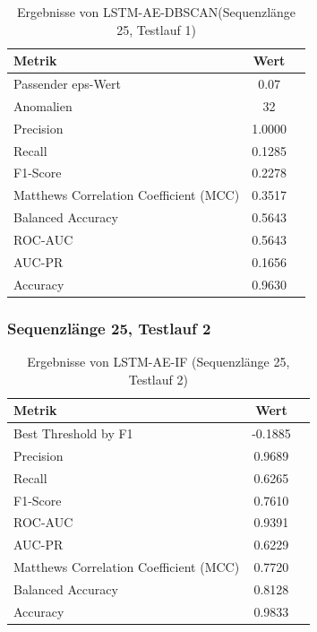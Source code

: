 \documentclass[a4paper,12pt]{article}
\begin{document}
\begin{table}[H]
	\centering
	\caption{Ergebnisse von LSTM-AE-DBSCAN(Sequenzlänge 25, Testlauf 1)}
	\begin{tabular}{lcc}
		\hline
		Metrik & Wert \\
		\hline
		Passender eps-Wert & 0.07 \\
		Anomalien & 32 \\
		Precision & 1.0000 \\
		Recall & 0.1285 \\
		F1-Score & 0.2278 \\
		Matthews Correlation Coefficient (MCC) & 0.3517 \\
		Balanced Accuracy & 0.5643 \\
		ROC-AUC & 0.5643 \\
		AUC-PR & 0.1656 \\
		Accuracy & 0.9630 \\
		\hline
	\end{tabular}
\end{table}

\subsubsection{Sequenzlänge 25, Testlauf 2}
\begin{table}[H]
	\centering
	\caption{Ergebnisse von LSTM-AE-IF (Sequenzlänge 25, Testlauf 2)}
	\begin{tabular}{lcc}
		\hline
		Metrik & Wert \\
		\hline
		Best Threshold by F1 & -0.1885 \\
		Precision & 0.9689 \\
		Recall & 0.6265 \\
		F1-Score & 0.7610 \\
		ROC-AUC & 0.9391 \\
		AUC-PR & 0.6229 \\
		Matthews Correlation Coefficient (MCC) & 0.7720 \\
		Balanced Accuracy & 0.8128 \\
		Accuracy & 0.9833 \\
		\hline
	\end{tabular}
\end{table}
\end{document}
